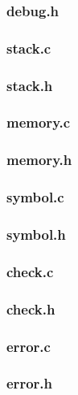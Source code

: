 \documentclass[a4paper,10pt,titlepage]{report}
\begin{document}
\subsubsection{debug.h}


\subsubsection{stack.c}


\subsubsection{stack.h}


\subsubsection{memory.c}


\subsubsection{memory.h}


\subsubsection{symbol.c}


\subsubsection{symbol.h}


\subsubsection{check.c}


\subsubsection{check.h}


\subsubsection{error.c}


\subsubsection{error.h}

\end{document}
